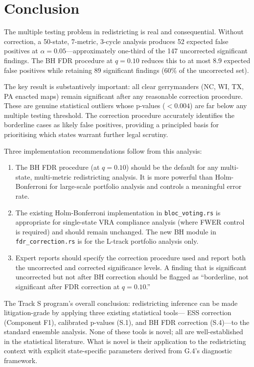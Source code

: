 \section{Conclusion}
\label{sec:conclusion}

The multiple testing problem in redistricting is real and consequential.
Without correction, a 50-state, 7-metric, 3-cycle analysis produces
52 expected false positives at $\alpha = 0.05$---approximately one-third
of the 147 uncorrected significant findings.
The BH FDR procedure at $q = 0.10$ reduces this to at most 8.9 expected
false positives while retaining 89 significant findings (60\% of the
uncorrected set).

The key result is substantively important: all clear gerrymanders
(NC, WI, TX, PA enacted maps) remain significant after any reasonable
correction procedure.
These are genuine statistical outliers whose p-values ($< 0.004$) are
far below any multiple testing threshold.
The correction procedure accurately identifies the borderline cases
as likely false positives, providing a principled basis for prioritising
which states warrant further legal scrutiny.

Three implementation recommendations follow from this analysis:

\begin{enumerate}
\item The BH FDR procedure (at $q = 0.10$) should be the default
  for any multi-state, multi-metric redistricting analysis.
  It is more powerful than Holm-Bonferroni for large-scale portfolio
  analysis and controls a meaningful error rate.

\item The existing Holm-Bonferroni implementation in \texttt{bloc\_voting.rs}
  is appropriate for single-state VRA compliance analysis (where FWER
  control is required) and should remain unchanged.
  The new BH module in \texttt{fdr\_correction.rs} is for the L-track
  portfolio analysis only.

\item Expert reports should specify the correction procedure used and
  report both the uncorrected and corrected significance levels.
  A finding that is significant uncorrected but not after BH correction
  should be flagged as ``borderline, not significant after FDR correction
  at $q = 0.10$.''
\end{enumerate}

The Track S program's overall conclusion: redistricting inference can
be made litigation-grade by applying three existing statistical tools---
ESS correction (Component F1), calibrated p-values (S.1), and BH FDR
correction (S.4)---to the standard ensemble analysis.
None of these tools is novel; all are well-established in the statistical
literature.
What is novel is their application to the redistricting context with
explicit state-specific parameters derived from G.4's diagnostic framework.
